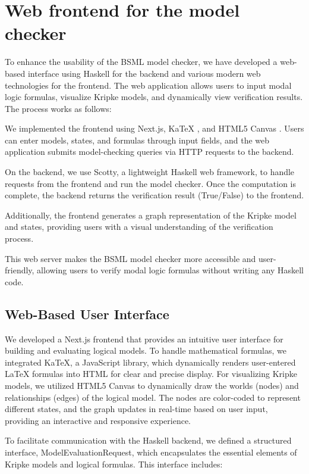 \section{Web frontend for the model checker}\label{sec:Web}

To enhance the usability of the BSML model checker, we have developed a web-based interface using Haskell for the backend and various modern web technologies for the frontend. The web application allows users to input modal logic formulas, visualize Kripke models, and dynamically view verification results. The process works as follows:

We implemented the frontend using Next.js, KaTeX \cite{katex}, and HTML5 Canvas \cite{html5_canvas}. Users can enter models, states, and formulas through input fields, and the web application submits model-checking queries via HTTP requests to the backend.

On the backend, we use Scotty, a lightweight Haskell web framework, to handle requests from the frontend and run the model checker. Once the computation is complete, the backend returns the verification result (True/False) to the frontend.

Additionally, the frontend generates a graph representation of the Kripke model and states, providing users with a visual understanding of the verification process.

This web server makes the BSML model checker more accessible and user-friendly, allowing users to verify modal logic formulas without writing any Haskell code.

\subsection{Web-Based User Interface}
We developed a Next.js frontend that provides an intuitive user interface for building and evaluating logical models.  To handle mathematical formulas, we integrated KaTeX, a JavaScript library, which dynamically renders user-entered LaTeX formulas into HTML for clear and precise display. For visualizing Kripke models, we utilized HTML5 Canvas to dynamically draw the worlds (nodes) and relationships (edges) of the logical model. The nodes are color-coded to represent different states, and the graph updates in real-time based on user input, providing an interactive and responsive experience.

To facilitate communication with the Haskell backend, we defined a structured interface, ModelEvaluationRequest, which encapsulates the essential elements of Kripke models and logical formulas. This interface includes:

